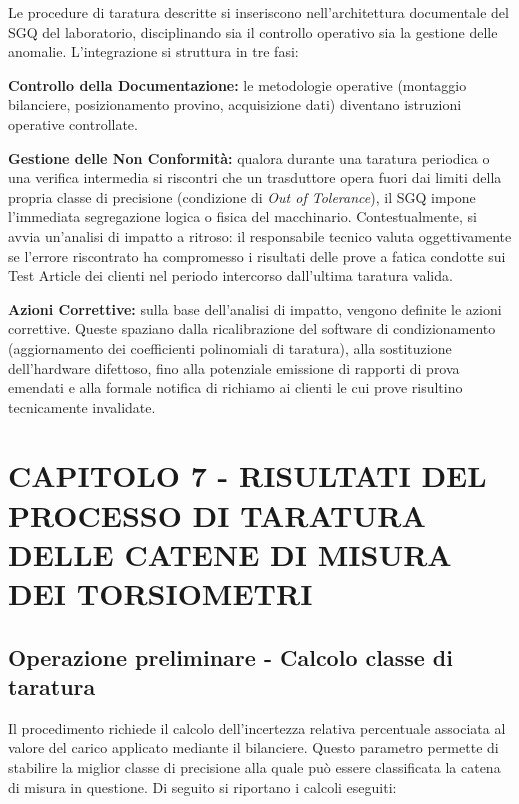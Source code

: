 \documentclass[a4paper, twoside]{article}
\begin{document}
Le procedure di taratura descritte si inseriscono nell'architettura documentale del SGQ del laboratorio, disciplinando sia il controllo operativo sia la gestione delle anomalie. L'integrazione si struttura in tre fasi:

\textbf{Controllo della Documentazione:} le metodologie operative (montaggio bilanciere, posizionamento provino, acquisizione dati) diventano istruzioni operative controllate.

\textbf{Gestione delle Non Conformità:} qualora durante una taratura periodica o una verifica intermedia si riscontri che un trasduttore opera fuori dai limiti della propria classe di precisione (condizione di \textit{Out of Tolerance}), il SGQ impone l'immediata segregazione logica o fisica del macchinario. Contestualmente, si avvia un'analisi di impatto a ritroso: il responsabile tecnico valuta oggettivamente se l'errore riscontrato ha compromesso i risultati delle prove a fatica condotte sui Test Article dei clienti nel periodo intercorso dall'ultima taratura valida.

\textbf{Azioni Correttive:} sulla base dell'analisi di impatto, vengono definite le azioni correttive. Queste spaziano dalla ricalibrazione del software di condizionamento (aggiornamento dei coefficienti polinomiali di taratura), alla sostituzione dell'hardware difettoso, fino alla potenziale emissione di rapporti di prova emendati e alla formale notifica di richiamo ai clienti le cui prove risultino tecnicamente invalidate.




    \newpage

\section{CAPITOLO 7 - RISULTATI DEL PROCESSO DI TARATURA DELLE CATENE DI MISURA DEI TORSIOMETRI }

\subsection{Operazione preliminare - Calcolo classe di taratura}

Il procedimento richiede il calcolo dell'incertezza relativa percentuale associata al valore del carico applicato mediante il bilanciere. Questo parametro permette di stabilire la miglior classe di precisione alla quale può essere classificata la catena di misura in questione. Di seguito si riportano i calcoli eseguiti:
\end{document}
